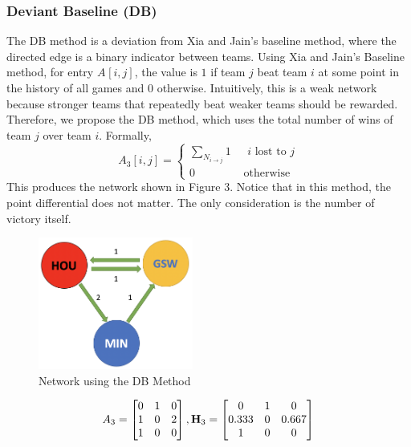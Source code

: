 \documentclass[12pt]{article}%
\begin{document}
\subsubsection{Deviant Baseline (DB)}
  \null\quad\quad The DB method is a deviation from Xia and Jain's baseline method, where the directed edge is a binary indicator between teams. Using Xia and Jain's Baseline method, for entry $A_{}[i,j]$, the value is $1$ if team $j$ beat team $i$ at some point in the history of all games and $0$ otherwise. Intuitively, this is a weak network because stronger teams that repeatedly beat weaker teams should be rewarded. Therefore, we propose the DB method, which uses the total number of wins of team $j$ over team $i$. Formally,
  \[
  A_{3}[i,j]=
  \begin{cases}
  \sum_{N_{i\rightarrow j}}1 &\text{ $i$ lost to $j$}\\
  0 &\text{ otherwise}
  \end{cases}
  \]
  This produces the network shown in Figure 3. Notice that in this method, the point differential does not matter. The only consideration is the number of victory itself.
  \begin{figure}[H]
	\centering
	\includegraphics[width=2in]{./images/DB.png}
	\caption[Network using the DB Method]{Network using the DB Method}
\end{figure}
\begin{align*}
A_3 =\begin{bmatrix}0 & 1 & 0\\1 & 0 & 2\\1 & 0 & 0\end{bmatrix}, \textbf H_3=\begin{bmatrix}0 & 1 & 0\\0.333 & 0 & 0.667\\1 & 0 & 0\end{bmatrix}
\end{align*}
\end{document}
